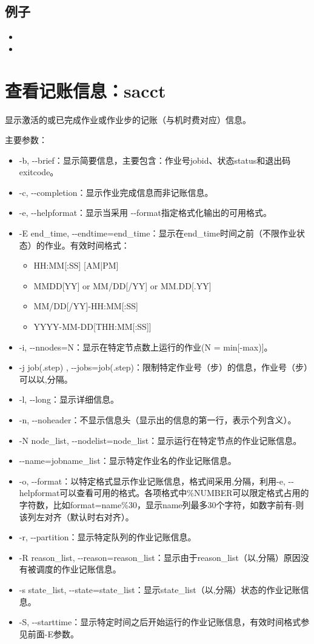 \subsection{例子}
\begin{itemize}
	\item {}
    \item {}
\end{itemize}

\section{查看记账信息：sacct}
显示激活的或已完成作业或作业步的记账（与机时费对应）信息。

主要参数：
\begin{itemize}
		\item -b, -{}-brief：显示简要信息，主要包含：作业号jobid、状态status和退出码exitcode。
		\item -c, -{}-completion：显示作业完成信息而非记账信息。
		\item -e, -{}-helpformat：显示当采用 -{}-format指定格式化输出的可用格式。
		\item -E end\_time, -{}-endtime=end\_time：显示在end\_time时间之前（不限作业状态）的作业。有效时间格式：
	\begin{itemize}
		\item HH:MM[:SS] [AM|PM]
		\item MMDD[YY] or MM/DD[/YY] or MM.DD[.YY]
		\item MM/DD[/YY]-HH:MM[:SS]
		\item YYYY-MM-DD[THH:MM[:SS]]
	\end{itemize}
	\item -i, -{}-nnodes=N：显示在特定节点数上运行的作业(N = min[-max)]。
	\item -j job(.step) , -{}-jobs=job(.step)：限制特定作业号（步）的信息，作业号（步）可以以,分隔。
	\item -l, -{}-long：显示详细信息。
	\item -n, -{}-noheader：不显示信息头（显示出的信息的第一行，表示个列含义）。
	\item -N node\_list, -{}-nodelist=node\_list：显示运行在特定节点的作业记账信息。
	\item -{}-name=jobname\_list：显示特定作业名的作业记账信息。
	\item -o, -{}-format：以特定格式显示作业记账信息，格式间采用,分隔，利用-e, -{}-helpformat可以查看可用的格式。各项格式中\%NUMBER可以限定格式占用的字符数，比如format=name\%30，显示name列最多30个字符，如数字前有-则该列左对齐（默认时右对齐）。
	\item -r, -{}-partition：显示特定队列的作业记账信息。
	\item -R reason\_list, -{}-reason=reason\_list：显示由于reason\_list（以,分隔）原因没有被调度的作业记账信息。
	\item -s state\_list, -{}-state=state\_list：显示state\_list（以,分隔）状态的作业记账信息。
	\item -S, -{}-starttime：显示特定时间之后开始运行的作业记账信息，有效时间格式参见前面-E参数。
\end{itemize}

